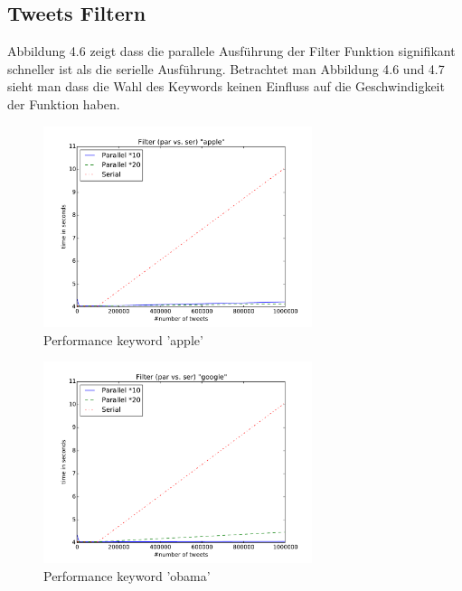 \documentclass[12pt, oneside]{report}   	%
\begin{document}
\subsection{Tweets Filtern}
Abbildung 4.6  zeigt dass die parallele Ausführung der Filter Funktion signifikant schneller ist als die serielle Ausführung. Betrachtet man Abbildung 4.6 und 4.7 sieht man dass die Wahl des Keywords keinen Einfluss auf die Geschwindigkeit der Funktion haben.
\begin{figure}[h]
\begin{center}
\includegraphics[width=0.7\textwidth]{bilder/time_filter_apple.pdf}
\caption{Performance keyword 'apple'}
\label{img:performancefilter1}
\end{center}
\end{figure}

\begin{figure}[h]
\begin{center}
\includegraphics[width=0.7\textwidth]{bilder/time_filter_google.pdf}
\caption{Performance keyword 'obama'}
\label{img:performancefilter3}
\end{center}
\end{figure}

\newpage{}
\end{document}
